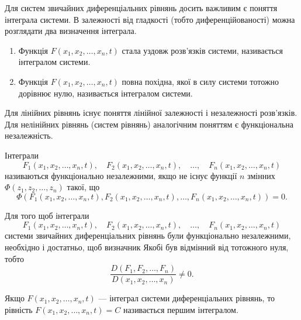Для систем звичайних диференціальних рівнянь досить важливим є поняття інтеграла системи. В залежності від гладкості (тобто диференційованості) можна розглядати два визначення інтеграла.

\begin{definition}
	\begin{enumerate}
		\item Функція $F(x_1, x_2, \ldots, x_n, t)$ стала уздовж розв'язків системи, називається інтегралом системи.
		\item Функція $F(x_1, x_2, \ldots, x_n, t)$ повна похідна, якої в силу системи тотожно дорівнює нулю, називається інтегралом системи.
	\end{enumerate}
\end{definition}

Для лінійних рівнянь існує поняття лінійної залежності і незалежності розв'язків. Для нелінійних рівнянь (систем рівнянь) аналогічним поняттям є функціональна незалежність.

\begin{definition}
	Інтеграли 
	\begin{equation*}
		F_1(x_1, x_2, \ldots, x_n, t), \quad F_2(x_1, x_2, \ldots, x_n, t), \quad \ldots, \quad F_n(x_1, x_2, \ldots, x_n, t)
	\end{equation*}
	називаються функціонально незалежними, якщо не існує функції $n$ змінних $\Phi(z_1, z_2, \ldots, z_n)$ такої, що
	\begin{equation*}
		\Phi(F_1(x_1, x_2, \ldots, x_n, t), F_2(x_1, x_2, \ldots, x_n, t), \ldots, F_n(x_1, x_2, \ldots, x_n, t)) = 0.
	\end{equation*}
\end{definition}

\begin{theorem}
	Для того щоб інтеграли 
	\begin{equation*}
		F_1(x_1, x_2, \ldots, x_n, t), \quad F_2(x_1, x_2, \ldots, x_n, t), \quad \ldots, \quad F_n(x_1, x_2, \ldots, x_n, t)
	\end{equation*}
	системи звичайних диференціальних рівнянь були функціонально незалежними, необхідно і достатньо, щоб визначник Якобі був відмінний від тотожного нуля, тобто 
	\begin{equation*}
		\frac{D(F_1, F_2, \ldots, F_n)}{D(x_1, x_2, \ldots, x_n)} \ne 0.
	\end{equation*}
\end{theorem}

\begin{definition}
	Якщо $F(x_1, x_2, \ldots, x_n, t)$ --- інтеграл системи диференціальних рівнянь, то рівність $F(x_1, x_2, \ldots, x_n, t) = C$ називається першим інтегралом.
\end{definition}


